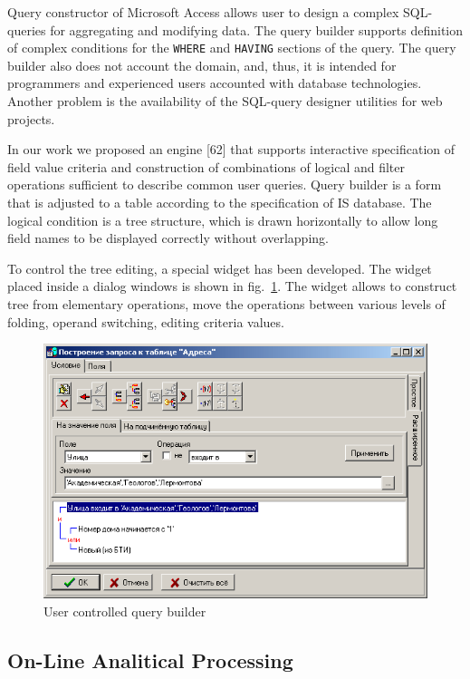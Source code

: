 \documentclass[conference]{IEEEtran}
\begin{document}
Query constructor of Microsoft Access allows user to design a complex SQL-queries for aggregating and modifying data.  The query builder supports definition of complex conditions for the \texttt{WHERE} and \texttt{HAVING} sections of the query.  The query builder also does not account the domain, and, thus, it is intended for programmers and experienced users accounted with database technologies.  Another problem is the availability of the SQL-query designer utilities for web projects.

In our work we proposed an engine [62] that supports interactive specification of field value criteria and construction of combinations of logical and filter operations sufficient to describe common user queries.  Query builder is a form that is adjusted to a table according to the specification of IS database.  The logical condition is a tree structure, which is drawn horizontally to allow long field names to be displayed correctly without overlapping.

To control the tree editing, a special widget has been developed.  The widget placed inside a dialog windows is shown in fig.~\ref{fig:qbuilder}.  The widget allows to construct tree from elementary operations, move the operations between various levels of folding, operand switching, editing criteria values.

\begin{figure}[tb]
  \centering
  \includegraphics[width=\linewidth]{qbuilder.png}
  \caption{User controlled query builder}
  \label{fig:qbuilder}
\end{figure}


\subsection{On-Line Analitical Processing}
\label{sec:olap}
\end{document}
